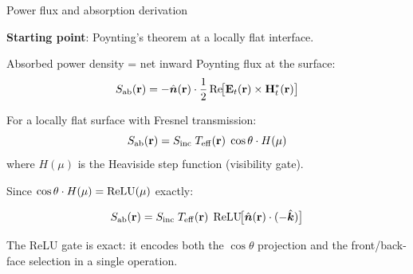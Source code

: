 \begin{frame}[label=app-p1-flux]{Power flux and absorption derivation}

  \textbf{Starting point}: Poynting's theorem at a locally flat interface.

  \vspace{4pt}
  Absorbed power density = net inward Poynting flux at the surface:
  \[
    S_{\mathrm{ab}}(\mathbf{r}) = -\hat{\bm{n}}(\mathbf{r}) \cdot \frac{1}{2}\operatorname{Re}\!\bigl[\mathbf{E}_t(\mathbf{r}) \times \mathbf{H}_t^*(\mathbf{r})\bigr]
  \]

  For a locally flat surface with Fresnel transmission:
  \[
    S_{\mathrm{ab}}(\mathbf{r}) = S_{\mathrm{inc}} \;T_{\mathrm{eff}}(\mathbf{r})\; \cos\theta \cdot H(\mu)
  \]
  where $H(\mu)$ is the Heaviside step function (visibility gate).

  \vspace{2pt}
  Since $\cos\theta \cdot H(\mu) = \operatorname{ReLU}(\mu)$ exactly:

  \begin{resultbox}
    \vspace{-6pt}
    \[
      S_{\mathrm{ab}}(\mathbf{r}) = S_{\mathrm{inc}}\;T_{\mathrm{eff}}(\mathbf{r})\;\operatorname{ReLU}\!\bigl[\hat{\bm{n}}(\mathbf{r})\cdot(-\hat{\bm{k}})\bigr]
    \]
  \end{resultbox}

  {\footnotesize The ReLU gate is exact: it encodes both the $\cos\theta$ projection and the
   front/back-face selection in a single operation.}
  \vspace{-4pt}
\end{frame}


